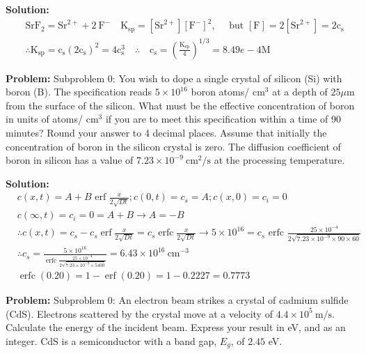 \documentclass[10pt]{article}
\begin{document}
\textbf{Solution:}
\[
\begin{aligned}
&\mathrm{SrF}_{2}=\mathrm{Sr}^{2+}+2 \mathrm{~F}^{-} \quad \mathrm{K}_{\mathrm{sp}}=\left[\mathrm{Sr}^{2+}\right]\left[\mathrm{F}^{-}\right]^{2}, \quad \text { but }[\mathrm{F}]=2\left[\mathrm{Sr}^{2+}\right]=2 \mathrm{c}_{\mathrm{s}} \\
&\therefore \mathrm{K}_{\mathrm{sp}}=\mathrm{c}_{\mathrm{s}}\left(2 \mathrm{c}_{\mathrm{s}}\right)^{2}=4 \mathrm{c}_{\mathrm{s}}^{3} \quad \therefore \quad \mathrm{c}_{\mathrm{s}}=\left(\frac{\mathrm{K}_{\mathrm{sp}}}{4}\right)^{1 / 3}= \boxed{8.49e-4} \mathrm{M}
\end{aligned}
\]


\textbf{Problem:}
Subproblem 0: You wish to dope a single crystal of silicon (Si) with boron (B). The specification reads $5 \times 10^{16}$ boron atoms/ $\mathrm{cm}^{3}$ at a depth of $25 \mu \mathrm{m}$ from the surface of the silicon. What must be the effective concentration of boron in units of atoms/ $\mathrm{cm}^{3}$ if you are to meet this specification within a time of 90 minutes? Round your answer to 4 decimal places. Assume that initially the concentration of boron in the silicon crystal is zero. The diffusion coefficient of boron in silicon has a value of $7.23 \times 10^{-9} \mathrm{~cm}^{2} / \mathrm{s}$ at the processing temperature. 


\textbf{Solution:}
\[
\begin{aligned}
&c(x, t)=A+B \text { erf } \frac{x}{2 \sqrt{D t}} ; c(0, t)=c_{s}=A ; c(x, 0)=c_{i}=0 \\
&c(\infty, t)=c_{i}=0=A+B \rightarrow A=-B \\
&\therefore c(x, t)=c_{s}-c_{s} \operatorname{erf} \frac{x}{2 \sqrt{D t}}=c_{s} \operatorname{erfc} \frac{x}{2 \sqrt{D t}} \rightarrow 5 \times 10^{16}=c_{s} \text { erfc } \frac{25 \times 10^{-4}}{2 \sqrt{7.23 \times 10^{-9} \times 90 \times 60}} \\
&\therefore c_{s}=\frac{5 \times 10^{16}}{\operatorname{erfc} \frac{25 \times 10^{-4}}{2 \sqrt{7.23 \times 10^{-9} \times 5400}}}=6.43 \times 10^{16} \mathrm{~cm}^{-3} \\
&\operatorname{erfc}(0.20)=1-\operatorname{erf}(0.20)=1-0.2227=\boxed{0.7773}
\end{aligned}
\]


\textbf{Problem:}
Subproblem 0: An electron beam strikes a crystal of cadmium sulfide (CdS). Electrons scattered by the crystal move at a velocity of $4.4 \times 10^{5} \mathrm{~m} / \mathrm{s}$. Calculate the energy of the incident beam. Express your result in eV, and as an integer. CdS is a semiconductor with a band gap, $E_{g}$, of $2.45$ eV.
\end{document}
